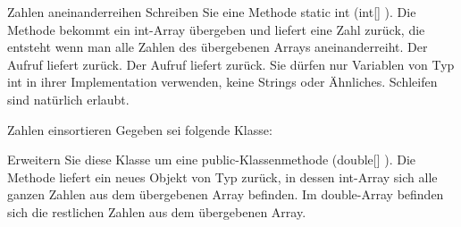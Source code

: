 \documentclass{../preamble}
\begin{document}
\clearpage

\begin{task}[credit = \stars{2}{3}]{Zahlen aneinanderreihen}
    Schreiben Sie eine Methode \textcolor{keywordcolor}{static} \textcolor{keywordcolor}{int} (\textcolor{keywordcolor}{int}[] ). Die Methode bekommt ein \textcolor{keywordcolor}{int}-Array übergeben und liefert eine Zahl zurück, die entsteht wenn man alle Zahlen des übergebenen Arrays aneinanderreiht. Der Aufruf  liefert  zurück. Der Aufruf  liefert  zurück. Sie dürfen nur Variablen von Typ \textcolor{keywordcolor}{int} in ihrer Implementation verwenden, keine \textcolor{keywordcolor}{Strings} oder Ähnliches. Schleifen sind natürlich erlaubt.

    \begin{solution}
        
    \end{solution}
\end{task}

\clearpage

\begin{task}[credit = \stars{2}{3}]{Zahlen einsortieren}
    Gegeben sei folgende Klasse:
    
    Erweitern Sie diese Klasse um eine \textcolor{keywordcolor}{public}-Klassenmethode  (\textcolor{keywordcolor}{double}[] ). Die Methode liefert ein neues Objekt von Typ  zurück, in dessen \textcolor{keywordcolor}{int}-Array sich alle ganzen Zahlen aus dem übergebenen Array  befinden. Im \textcolor{keywordcolor}{double}-Array befinden sich die restlichen Zahlen aus dem übergebenen Array.

    \begin{solution}
        
    \end{solution}
\end{task}

\clearpage
\end{document}
